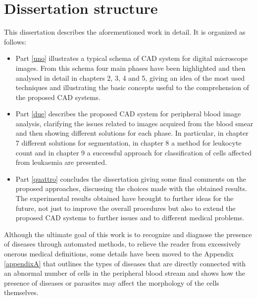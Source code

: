 \documentclass[final,a4paper,12pt,english]{UnicaPhdThesis3}
\begin{document}
	\section{Dissertation structure} %
	This dissertation describes the aforementioned work in detail. It is organized as follows:
	\begin{itemize}
		\item Part \ref{uno} illustrates a typical schema of CAD system for digital microscope images. From this schema four main phases have been highlighted and then analysed in detail in chapters 2, 3, 4 and 5, giving an idea of the most used techniques and illustrating the basic concepts useful to the comprehension of the proposed CAD systems. 
		
		\item Part \ref{due} describes the proposed CAD system for peripheral blood image analysis, clarifying the issues related to images acquired from the blood smear and then showing different solutions for each phase. In particular, in chapter 7 different solutions for segmentation, in chapter 8 a method for leukocyte count and in chapter 9 a successful approach for classification of cells affected from leukaemia are presented. 
		\item Part \ref{quattro} concludes the dissertation giving some final comments on the proposed approaches, discussing the choices made with the obtained results. The experimental results obtained have brought to further ideas for the future, not just to improve the overall procedures but also to extend the proposed CAD systems to further issues and to different medical problems. 
	\end{itemize}
	Although the ultimate goal of this work is to recognize and diagnose the presence of diseases through automated methods, to relieve the reader from excessively onerous medical definitions, some details have been moved to the Appendix \ref{appendixA} that outlines the types of diseases that are directly connected with an abnormal number of cells in the peripheral blood stream and shows how the presence of diseases or parasites may affect the morphology of the cells themselves.
	
\end{document}
